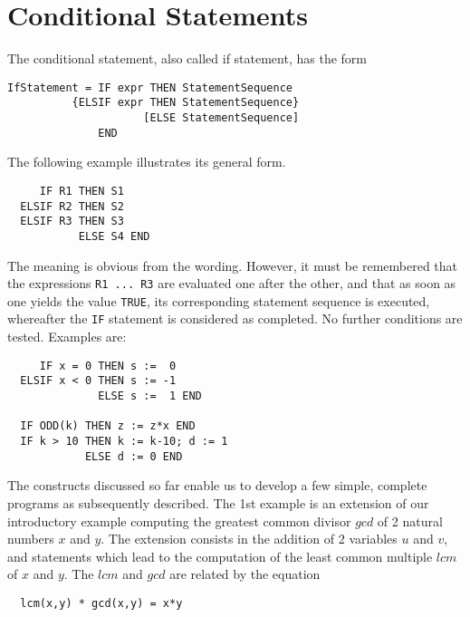\section{Conditional Statements}
The conditional statement, also called if statement, has the form
\begin{verbatim}
IfStatement = IF expr THEN StatementSequence
          {ELSIF expr THEN StatementSequence}
                     [ELSE StatementSequence]
              END
\end{verbatim}
The following example illustrates its general form.
\begin{verbatim}
     IF R1 THEN S1
  ELSIF R2 THEN S2
  ELSIF R3 THEN S3
           ELSE S4 END
\end{verbatim}
The meaning is obvious from the wording. However, it must be remembered that the expressions
\verb|R1 ... R3| are evaluated one after the other, and that as soon as one yields the value
\verb|TRUE|, its corresponding statement sequence is executed, whereafter the \verb|IF| statement
is considered as completed. No further conditions are tested. Examples are:
\begin{verbatim}
     IF x = 0 THEN s :=  0
  ELSIF x < 0 THEN s := -1
              ELSE s :=  1 END

  IF ODD(k) THEN z := z*x END
  IF k > 10 THEN k := k-10; d := 1
            ELSE d := 0 END
\end{verbatim}

The constructs discussed so far enable us to develop a few simple, complete programs as
subsequently described. The 1st example is an extension of our introductory example computing
the greatest common divisor $gcd$ of 2 natural numbers $x$ and $y$. The extension consists in
the addition of 2 variables $u$ and $v$, and statements which lead to the computation of the
least common multiple $lcm$ of $x$ and $y$. The $lcm$ and $gcd$ are related by the equation
\begin{verbatim}
  lcm(x,y) * gcd(x,y) = x*y
\end{verbatim}

